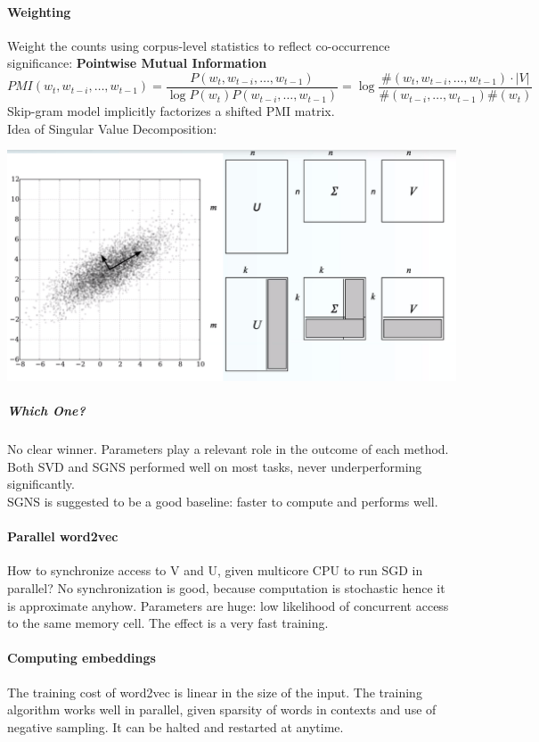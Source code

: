 \documentclass[10pt]{report}
\begin{document}
\paragraph{Weighting} Weight the counts using corpus-level statistics to reflect co-occurrence significance: \textbf{Pointwise Mutual Information} $$ PMI(w_t,w_{t-i},\ldots,w_{t-1}) = \frac{P(w_t,w_{t-i},\ldots,w_{t-1})}{\log P(w_t)P(w_{t-i},\ldots,w_{t-1})} = \log\frac{\#(w_t,w_{t-i},\ldots,w_{t-1})\cdot|V|}{\#(w_{t-i},\ldots,w_{t-1})\#(w_t)}$$
Skip-gram model implicitly factorizes a shifted PMI matrix.\\
Idea of Singular Value Decomposition:
\begin{center}
	\includegraphics[scale=0.5]{6.png}
\end{center}
\subparagraph{Which One?} No clear winner. Parameters play a relevant role in the outcome of each method. Both SVD and SGNS performed well on most tasks, never underperforming significantly.\\
SGNS is suggested to be a good baseline: faster to compute and performs well.
\paragraph{Parallel word2vec} How to synchronize access to V and U, given multicore CPU to run SGD in parallel? No synchronization is good, because computation is stochastic hence it is approximate anyhow. Parameters are huge: low likelihood of concurrent access to the same memory cell. The effect is a very fast training.
\paragraph{Computing embeddings} The training cost of word2vec is linear in the size of the input. The training algorithm works well in parallel, given sparsity of words in contexts and use of negative sampling. It can be halted and restarted at anytime.
\end{document}
